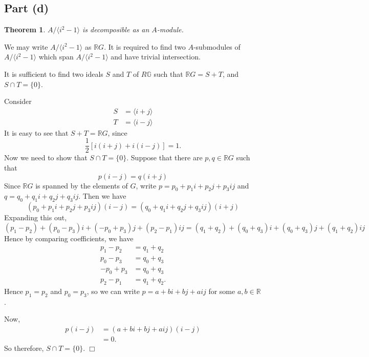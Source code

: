 \documentclass[10pt]{article}
\newtheorem{theorem}{Theorem}
\newenvironment{proof}[1][Proof]{\begin{trivlist}
\item[\hskip \labelsep {\bfseries #1}]}{\end{trivlist}}
\newcommand{\la}{\langle}
\newcommand{\ra}{\rangle}
\begin{document}
\subsection*{Part (d)}
\begin{theorem}
    $A/\langle i^2-1\rangle$ is decomposible as an $A$-module.
\end{theorem}
\begin{proof}
    We may write $A/\la i^2-1\ra$ as $\mathbb{R}G$.
    It is required to find two $A$-submodules of $A/\la i^2-1\ra$
    which span $A/\la i^2-1\ra$ and have trivial intersection. 
    
    It is sufficient to find two ideals $S$ and $T$ of $R\mathbb{G}$
    such that $\mathbb{R}G = S+T$, and $S\cap T = \{0\}$.
    
    Consider
    \begin{align*}
        S &= \la i+j\ra\\
        T &= \la i-j\ra
    \end{align*}
    It is easy to see that $S+T = \mathbb{R}G$, since
    \begin{equation*}
        \frac{1}{2}[i(i+j)+i(i-j)] = 1.
    \end{equation*}
    Now we need to show that $S\cap T = \{0\}$. Suppose
    that there are $p,q\in \mathbb{R}G$ such that
    \begin{equation*}
        p(i-j) = q(i+j)
    \end{equation*}
    Since $\mathbb{R}G$ is spanned by the elements of $G$, write $p = p_0 +p_1i+p_2j+p_3ij$
    and $q = q_0+q_1i+q_2j+q_3ij$. Then we have
    \begin{equation*}
        (p_0 +p_1i+p_2j+p_3ij)(i-j) = (q_0 +q_1i+q_2j+q_3ij)(i+j)
    \end{equation*} 
    Expanding this out,
    \begin{equation*}
        (p_1-p_2)+(p_0-p_3)i+(-p_0+p_3)j+(p_2-p_1)ij = (q_1+q_2)+(q_0+q_3)i+(q_0+q_3)j+(q_1+q_2)ij
    \end{equation*}
    Hence by comparing coefficients, we have
    \begin{align*}
        p_1-p_2 &= q_1+q_2\\
        p_0-p_3 &= q_0+q_3\\
        -p_0+p_3 &= q_0+q_3\\
        p_2-p_1 &= q_1+q_2.
    \end{align*}
    Hence $p_1 = p_2$ and $p_0 = p_3$, so we can write $p = a+bi+bj+aij$
    for some $a,b\in \mathbb{R}$. 
    
    Now, 
    \begin{align*}
        p(i-j) &= (a+bi+bj+aij)(i-j)\\
        &= 0.
    \end{align*}
    So therefore, $S\cap T = \{0\}$. $\Box$
    
    
\end{proof}
\end{document}
